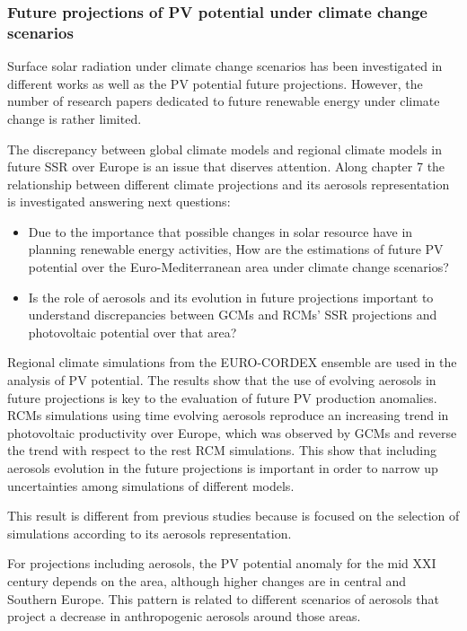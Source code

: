 \subsubsection{Future projections of PV potential under climate change scenarios}

Surface solar radiation under climate change scenarios has been investigated in different works as well as the PV potential future projections. However, the number of research papers dedicated to future renewable energy under climate change is rather limited.

The discrepancy between global climate models and regional climate models in future SSR over Europe is an issue that diserves attention. Along chapter 7 the relationship between different climate projections and its aerosols representation is investigated answering next questions:

\begin{itemize}
\item Due to the importance that possible changes in solar resource have in planning renewable energy activities, How are the estimations of future PV potential over the Euro-Mediterranean area under climate change scenarios?
\item Is the role of aerosols and its evolution in future projections important to understand discrepancies between GCMs and RCMs' SSR projections and photovoltaic potential over that area?

\end{itemize}

  Regional climate simulations from the EURO-CORDEX ensemble are used in the analysis of PV potential. The results show that the use of evolving aerosols in future projections is key to the evaluation of future PV production anomalies. RCMs simulations using time evolving aerosols reproduce an increasing trend in photovoltaic productivity over Europe, which was observed by GCMs and reverse the trend with respect to the rest RCM simulations. This show that including aerosols evolution in the future projections is important in order to narrow up uncertainties among simulations of different models. 

  This result is different from previous studies because is focused on the selection of simulations according to its aerosols representation.
  
  For projections including aerosols, the PV potential anomaly for the mid XXI century depends on the area, although higher changes are in central and Southern Europe. This pattern is related to different scenarios of aerosols that project a decrease in anthropogenic aerosols around those areas.

